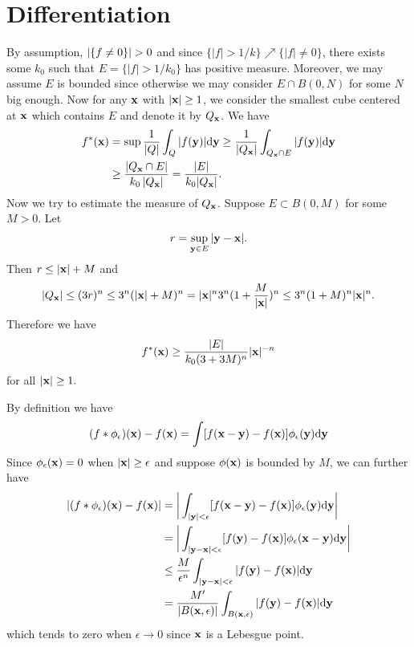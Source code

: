 \section{Differentiation}
\begin{exercise}{7.1}
  By assumption, $\left\vert\{f\neq 0\}\right\vert>0$ and since $\{|f|>1/k\}\nearrow\{|f|\neq 0\}$, there exists some $k_0$ such that $E=\{|f|>1/k_0\}$ has positive measure. Moreover, we may assume $E$ is bounded since otherwise we may consider $E\cap B(0,N)$ for some $N$ big enough. Now for any $\mathbf{x}$ with $|\mathbf{x}|\geq 1$, we consider the smallest cube centered at $\mathbf{x}$ which contains $E$ and denote it by $Q_{\mathbf{x}}$. We have
  \begin{align*}
      f^*(\mathbf{x})&=\sup\frac{1}{|Q|}\int_Q|f(\mathbf{y})|\mathrm{d}\mathbf{y}\geq \frac{1}{|Q_{\mathbf{x}}|}\int_{Q_{\mathbf{x}}\cap E}|f(\mathbf{y})|\mathrm{d}\mathbf{y}\\
      &\geq \frac{\left\vert Q_{\mathbf{x}}\cap E\right\vert}{k_0\left\vert Q_{\mathbf{x}}\right\vert}=\frac{|E|}{k_0|Q_{\mathbf{x}}|}.
  \end{align*}
  Now we try to estimate the measure of $Q_{\mathbf{x}}$. Suppose $E\subset B(0,M)$ for some $M>0$. Let 
  \[
    r=\sup_{\mathbf{y}\in E}|\mathbf{y}-\mathbf{x}|.
  \]
  Then $r\leq |\mathbf{x}|+M$ and 
  \[
    |Q_{\mathbf{x}}|\leq (3r)^n\leq 3^n(|\mathbf{x}|+M)^n=|\mathbf{x}|^n3^n(1+\frac{M}{|\mathbf{x}|})^n\leq 3^n(1+M)^n|\mathbf{x}|^n.
  \]
  Therefore we have 
  \[
    f^*(\mathbf{x})\geq \frac{|E|}{k_0(3+3M)^n}|\mathbf{x}|^{-n}
  \]
  for all $|\mathbf{x}|\geq 1.$
\end{exercise}

\begin{exercise}{7.2}
  By definition we have
  \[
    (f*\phi_\epsilon)(\mathbf{x})-f(\mathbf{x})=\int[f(\mathbf{x}-\mathbf{y})-f(\mathbf{x})]\phi_\epsilon(\mathbf{y})\mathrm{d}\mathbf{y}
  \]
  Since $\phi_\epsilon(\mathbf{x})=0$ when $|\mathbf{x}|\geq\epsilon$ and suppose $\phi(\mathbf{x})$ is bounded by $M$, we can further have
  \begin{align*}
      |(f*\phi_\epsilon)(\mathbf{x})-f(\mathbf{x})|&=\bigg|\int_{|\mathbf{y}|<\epsilon}[f(\mathbf{x}-\mathbf{y})-f(\mathbf{x})]\phi_\epsilon(\mathbf{y})\mathrm{d}\mathbf{y}\bigg|\\
      &=\bigg|\int_{|\mathbf{y}-\mathbf{x}|<\epsilon}[f(\mathbf{y})-f(\mathbf{x})]\phi_\epsilon(\mathbf{x}-\mathbf{y})\mathrm{d}\mathbf{y}\bigg|\\
      &\leq \frac{M}{\epsilon^n}\int_{|\mathbf{y}-\mathbf{x}|<\epsilon}|f(\mathbf{y})-f(\mathbf{x})|\mathrm{d}\mathbf{y}\\
      &=\frac{M'}{\left\vert B(\mathbf{x},\epsilon)\right\vert}\int_{B(\mathbf{x},\epsilon)}|f(\mathbf{y})-f(\mathbf{x})|\mathrm{d}\mathbf{y}
  \end{align*}
  which tends to zero when $\epsilon\rightarrow 0$ since $\mathbf{x}$ is a Lebesgue point.
 \end{exercise}
 
